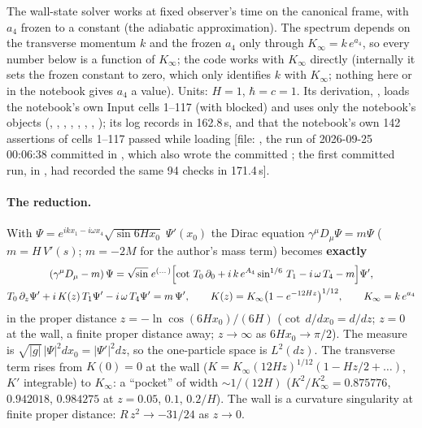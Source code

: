 The wall-state solver works at fixed observer's time on the canonical frame, with $a_4$ frozen to a
constant (the adiabatic approximation). The spectrum depends on the transverse momentum $k$ and the frozen
$a_4$ only through $K_\infty=k\,e^{a_4}$, so every number below is a function of $K_\infty$; the code works
with $K_\infty$ directly (internally it sets the frozen constant to zero, which only identifies $k$ with
$K_\infty$; nothing here or in the notebook gives $a_4$ a value). Units: $H=1$, $\hbar=c=1$. Its
derivation, , loads the notebook's own Input cells
1--117 (with  blocked) and uses only the notebook's objects (,
, , , ,
, , ); its log records
 in 162.8\,s, and that the notebook's own 142 assertions of cells
1--117 passed while loading [file: , the run of
2026-09-25 00:06:38 committed in , which also wrote the committed
; the first committed run, in , had recorded the same 94 checks
in 171.4\,s].

\paragraph{The reduction.} With $\Psi=e^{ikx_1-i\omega x_4}\sqrt{\sin 6Hx_0}\;\Psi'(x_0)$ the Dirac equation
$\gamma^\mu D_\mu\Psi=m\Psi$ ($m=H\,V'(s)$; $m=-2M$ for the author's mass term) becomes \textbf{exactly}
\begin{gather*}
  (\gamma^\mu D_\mu-m)\,\Psi=\sqrt{\sin}\;e^{(\dots)}\Bigl[\cot\,T_0\,\partial_0+i\,k\,e^{A_4}\sin^{1/6}\,T_1-i\,\omega\,T_4-m\Bigr]\Psi',\\
  T_0\,\partial_z\Psi'+i\,K(z)\,T_1\Psi'-i\,\omega\,T_4\Psi'=m\,\Psi',\qquad
  K(z)=K_\infty\bigl(1-e^{-12Hz}\bigr)^{1/12},\qquad K_\infty=k\,e^{a_4}
\end{gather*}
in the proper distance $z=-\ln\cos(6Hx_0)/(6H)$ ($\cot\,d/dx_0=d/dz$; $z=0$ at the wall, a finite proper
distance away; $z\to\infty$ as $6Hx_0\to\pi/2$). The measure is
$\sqrt{|g|}\,|\Psi|^2dx_0=|\Psi'|^2dz$, so the one-particle space is $L^2(dz)$. The transverse term rises
from $K(0)=0$ at the wall ($K=K_\infty(12Hz)^{1/12}(1-Hz/2+\dots)$, $K'$ integrable) to $K_\infty$: a
``pocket'' of width $\sim1/(12H)$ ($K^2/K_\infty^2=0.875776$, $0.942018$, $0.984275$ at $z=0.05$, $0.1$,
$0.2/H$). The wall is a curvature singularity at finite proper distance: $R\,z^2\to-31/24$ as $z\to0$.

